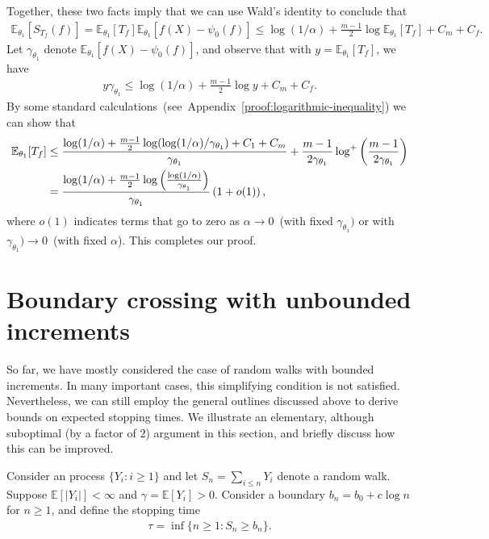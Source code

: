 \documentclass[12pt]{article}
\begin{document}
Together, these two facts imply that we can use Wald's identity to conclude that 
\begin{align}
   \mathbb{E}_{\theta_1}[S_{T_f}(f)] =  \mathbb{E}_{\theta_1}[T_f] \mathbb{E}_{\theta_1}[f(X) - \psi_0(f)] \leq \log(1/\alpha) + \frac{m-1}{2} \log \mathbb{E}_{\theta_1}[T_f] + C_m + C_f. 
\end{align}
Let $\gamma_{\theta_1}$ denote $\mathbb{E}_{\theta_1}[f(X) - \psi_0(f)]$, and observe that with $y = \mathbb{E}_{\theta_1}[T_f]$, we have 
\begin{align}
     y \gamma_{\theta_1} \leq \log(1/\alpha) + \frac{m-1}{2} \log y + C_m + C_f. 
\end{align}
By some standard calculations~(see~Appendix~\ref{proof:logarithmic-inequality}) we can show that 
\begin{align}
    \mathbb{E}_{\theta_1}[T_f] & \leq \frac{ \log(1/\alpha) + \frac{m-1}{2}\log(\log(1/\alpha)/\gamma_{\theta_1}) + C_1 + C_m }{\gamma_{\theta_1}} + \frac{m-1}{2 \gamma_{\theta_1}} \log^+\left(\frac{m-1}{2\gamma_{\theta_1}} \right)  \\
    &= \frac{\log(1/\alpha) + \frac{m-1}{2} \log \left( \frac{\log(1/\alpha)}{\gamma_{\theta_1}} \right)}{\gamma_{\theta_1}} \left( 1 + o(1)\right), 
\end{align}
where $o(1)$ indicates terms that go to zero as $\alpha \to 0$~(with fixed $\gamma_{\theta_1})$ or with $\gamma_{\theta_1}) \to 0$~(with fixed $\alpha$). This completes our proof. 


\section{Boundary crossing with unbounded increments}
\label{sec:boundary-crossing}

So far, we have mostly considered the case of random walks with bounded increments. In many important cases, this simplifying condition is not satisfied. Nevertheless, we can still employ the general outlines discussed above to derive bounds on expected stopping times. We illustrate an elementary, although suboptimal (by a factor of $2$) argument in this section, and briefly discuss how this can be improved. 


Consider an \iid process $\{Y_i: i \geq 1\}$ and let $S_n = \sum_{i\leq n} Y_i$ denote a random walk. Suppose $\mathbb{E}[|Y_i|]<\infty$ and $\gamma = \mathbb{E}[Y_i]>0$. Consider a boundary $b_n = b_0 + c \log n$ for $n \geq 1$, and define the stopping time 
\begin{align}
    \tau = \inf \{n \geq 1: S_n \geq b_n \}.     
\end{align}
\end{document}
